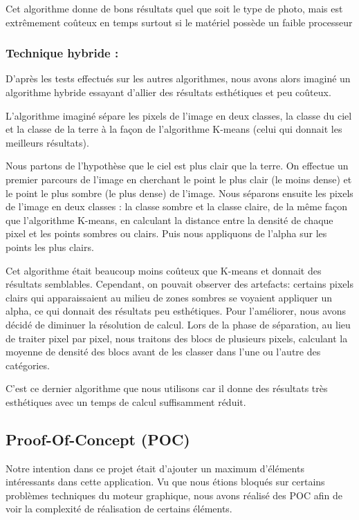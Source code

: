 \documentclass{report}
\begin{document}
Cet algorithme donne de bons résultats quel que soit le type de photo,
mais est extrêmement coûteux en temps surtout si le matériel possède un
faible processeur

\subsubsection{Technique hybride :}

D’après les tests effectués sur les autres algorithmes, nous avons alors
imaginé un algorithme hybride essayant d’allier des résultats esthétiques
et peu coûteux.
\bigskip

L’algorithme imaginé sépare les pixels de l’image en deux classes, la
classe du ciel et la classe de la terre à la façon de l’algorithme
K-means (celui qui donnait les meilleurs résultats).

Nous partons de
l’hypothèse que le ciel est plus clair que la terre. On effectue un
premier parcours de l’image en cherchant le point le plus clair (le
moins dense) et le point le plus sombre (le plus dense) de l’image. Nous
séparons ensuite les pixels de l’image en deux classes : la classe
sombre et la classe claire, de la même façon que l’algorithme K-means,
en calculant la distance entre la densité de chaque pixel et les points
sombres ou clairs. Puis nous appliquons de l’alpha sur les points les plus clairs.
\bigskip

Cet algorithme était beaucoup moins coûteux que K-means et donnait des
résultats semblables. Cependant, on pouvait observer des
artefacts: certains pixels clairs qui
apparaissaient au milieu de zones sombres se voyaient appliquer un
alpha, ce qui donnait des résultats peu esthétiques. Pour l’améliorer,
nous avons décidé de diminuer la résolution de calcul. Lors de la phase
de séparation, au lieu de traiter pixel par pixel, nous traitons des
blocs de plusieurs pixels, calculant la moyenne de densité des blocs
avant de les classer dans l’une ou l’autre des catégories.
\bigskip

C’est ce dernier algorithme que nous utilisons car il donne des
résultats très esthétiques avec un temps de calcul suffisamment réduit.

\subsection{Proof-Of-Concept (POC)}

Notre intention dans ce projet était d’ajouter un maximum d'éléments
intéressants dans cette application. Vu que nous étions bloqués sur
certains problèmes techniques du moteur graphique, nous avons réalisé
des POC afin de voir la complexité de réalisation de certains éléments.
\end{document}
